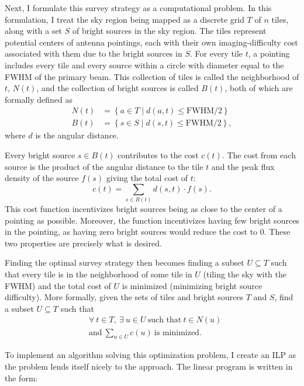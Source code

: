 \documentclass{article}
\begin{document}
\begin{multicols*}{2}
Next, I formulate this survey strategy as a
computational problem. In this formulation, I
treat the sky region being mapped as a discrete
grid $T$ of $n$ tiles, along with a set $S$ of bright sources in the sky region. The tiles represent potential centers of antenna pointings, each with their own imaging-difficulty cost associated with them due to the bright sources in $S$. For every tile $t$, a pointing includes every tile and
every source within a circle with diameter equal
to the FWHM of the primary beam. This collection
of tiles is called the neighborhood of $t$, $N(t)$, and the collection of bright sources is called $B(t)$, both of which are formally defined as
\begin{align}
    N(t) &= \left\{a \in T \mid d(a,t) \leq \mbox{FWHM}/2 \right\}\\
    B(t) &= \left\{s \in S \mid d(s,t) \leq \mbox{FWHM}/2 \right\},
    \label{eq:neighborhood}
\end{align}
where $d$ is the angular distance. 

Every bright source $s \in B(t)$ contributes to the cost $c(t)$. The cost from each source is the product of the angular distance to the tile $t$ and the peak flux density of the source $f(s)$ giving the total cost of $t$:
\begin{equation}
    c(t) = \sum_{s \in B(t)} d(s,t) \cdot f(s).
    \label{eq:cost}
\end{equation}
This cost function incentivizes bright sources being as close to the center of a pointing as possible. Moreover, the function incentivizes having few bright sources in the pointing, as having zero bright sources would reduce the cost to 0. These two properties are precisely what is desired.

Finding the optimal survey strategy then becomes finding a subset $U \subseteq T$ such that every tile is in the neighborhood of some tile in $U$ (tiling the sky with the FWHM) and the total cost of $U$ is minimized (minimizing bright source difficulty). More formally, given the sets of tiles and bright sources $T$ and $S$, find a subset $U \subseteq T$ such that 
\begin{align*}
    &\forall\ t \in T,\ \exists\ u \in U\ \mbox{such that}\ t \in N(u)\\
    &\mbox{and}\ \sum_{u \in U} c(u)\ \mbox{is minimized}.
\end{align*}

To implement an algorithm solving this optimization problem, I create an ILP as the problem lends itself nicely to the approach. The linear program is written in the form:


\end{multicols*}
\end{document}
